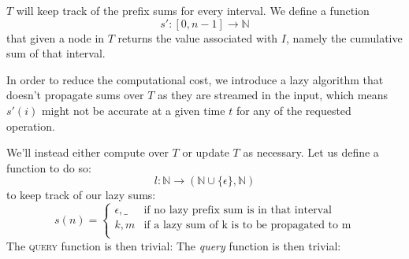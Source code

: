 \documentclass{article}
\begin{document}
$T$ will keep track of the prefix sums for every interval.
We define a function
\begin{equation}
    s': [0, n - 1] \to \mathbb{N}
\end{equation}
that given a node in $T$ returns the value associated with $I$, namely the
cumulative sum of that interval.

In order to reduce the computational cost, we introduce a lazy algorithm
that doesn't propagate sums over $T$ as they are streamed in the input,
which means $s'(i)$ might not be accurate at a given time $t$ for any of the
requested operation.

We'll instead either compute over $T$ or update $T$ as necessary.
Let us define a function to do so:
\begin{equation}
    l: \mathbb{N} \to (\mathbb{N} \cup \{\epsilon\}, \mathbb{N})
\end{equation}
to keep track of our lazy sums:
\begin{equation}
    s(n) = \begin{cases}
            \epsilon, \_            &   \textrm{if no lazy prefix sum is in that interval} \\
            k, m                    &   \textrm{if a lazy sum of k is to be propagated to m}\\
            \end{cases}
\end{equation}
The \textsc{query} function is then trivial:
The \emph{query} function is then trivial:
\end{document}
